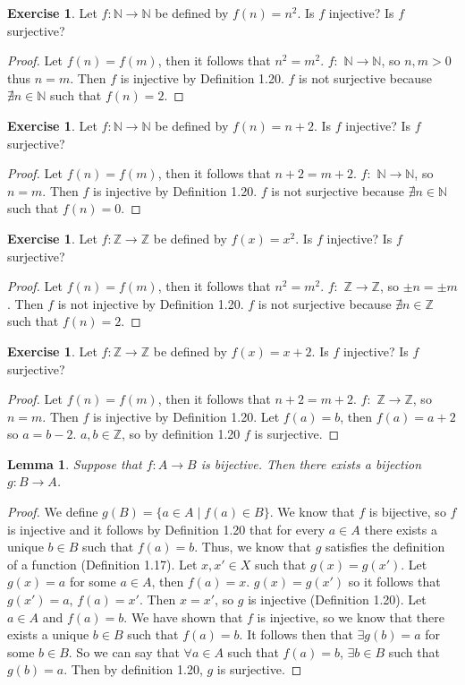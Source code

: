 \documentclass[12pt]{article}
\newtheorem{lemma}[theorem]{Lemma}
\theoremstyle{definition}
\newtheorem{exercise}[theorem]{Exercise}
\numberwithin{equation}{subsection}
\begin{document}
{\begin{exercise}
Let $f:{\mathbb N}\rightarrow {\mathbb N}$ be defined by $f(n)=n^2$.  Is $f$ injective?  Is $f$ surjective?
\end{exercise}
\begin {proof}
Let $f(n) = f(m)$, then it follows that $n^2 = m^2$. $f :$ $\mathbb N \to \mathbb N$, so $n, m > 0$ thus $n = m$. Then $f$ is injective by Definition 1.20. $f$ is not surjective because $\nexists n \in \mathbb N$ such that $f(n) = 2$.
\end {proof}
\begin{exercise}
Let $f:{\mathbb N}\rightarrow {\mathbb N}$ be defined by $f(n)=n+2$.  Is $f$ injective?  Is $f$ surjective?
\end{exercise}
\begin {proof}
Let $f(n) = f(m)$, then it follows that $n + 2= m + 2$. $f :$ $\mathbb N \to \mathbb N$, so $n = m$. Then $f$ is injective by Definition 1.20. $f$ is not surjective because $\nexists n \in \mathbb N$ such that $f(n) = 0$.
\end {proof}
\begin{exercise}
Let $f:{\mathbb Z}\rightarrow {\mathbb Z}$ be defined by $f(x)=x^2$.  Is $f$ injective?  Is $f$ surjective?
\end{exercise}
\begin {proof}
Let $f(n) = f(m)$, then it follows that $n^2= m^2$. $f :$ $\mathbb Z \to \mathbb Z$, so $\pm n = \pm m$. Then $f$ is not injective by Definition 1.20. $f$ is not surjective because $\nexists n \in \mathbb Z$ such that $f(n) = 2$.
\end {proof}
\begin{exercise}
Let $f:{\mathbb Z}\rightarrow {\mathbb Z}$ be defined by $f(x)=x+2$.  Is $f$ injective?  Is $f$ surjective?
\end{exercise}
\begin {proof}
Let $f(n) = f(m)$, then it follows that $n+2= m+2$. $f :$ $\mathbb Z \to \mathbb Z$, so $n = m$. Then $f$ is injective by Definition 1.20. Let $f(a) = b$, then $f(a) = a +2$ so $a = b - 2$. $a,b \in \mathbb Z$, so by definition 1.20 $f$ is surjective.
\end {proof}
\begin{lemma} 
Suppose that $f \colon A \rightarrow B$ is bijective.  
Then there exists a bijection $g \colon B \rightarrow A$.
\end{lemma}
\begin {proof}
We define $g(B) = \{a \in A \mid f(a) \in B\}$. We know that $f$ is bijective, so $f$ is injective and it follows by Definition 1.20 that for every $a \in A$ there exists a unique $b \in B$ such that $f(a) = b$. Thus, we know that $g$ satisfies the definition of a function (Definition 1.17). Let $x, x' \in X$ such that $g(x) = g(x')$. Let $g(x) = a$ for some $a \in A$, then $f(a) = x$. $g(x) = g(x')$ so it follows that $g(x') = a$, $f(a) = x'$. Then $x = x'$, so $g$ is injective (Definition 1.20). Let $a \in A$ and $f(a) = b$. We have shown that $f$ is injective, so we know that there exists a unique $b \in B$ such that $f(a) = b$. It follows then that $\exists g(b) = a$ for some $b \in B$. So we can say that $\forall a \in A$ such that $f(a) = b$, $\exists b \in B$ such that $g(b) = a$. Then by definition 1.20, $g$ is surjective.

\end{proof}}
\end{document}
